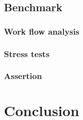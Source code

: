     \textcolor{gray}{\blindtext}

    \textcolor{gray}{\blindtext}

    \textcolor{gray}{\blindtext}
\section{Benchmark}
    \textcolor{gray}{\blindtext}

    \subsection{Work flow analysis}
    \textcolor{gray}{\blindtext}

    \textcolor{gray}{\blindtext}

    \subsection{Stress tests}
    \textcolor{gray}{\blindtext}

    \textcolor{gray}{\blindtext}

    \textcolor{gray}{\blindtext}

    \textcolor{gray}{\blindtext}

    \textcolor{gray}{\blindtext}

    \textcolor{gray}{\blindtext}

    \subsection{Assertion}
    \textcolor{gray}{\blindtext}

    \textcolor{gray}{\blindtext}

\chapter{Conclusion}
    \textcolor{gray}{\blindtext}
    \textcolor{gray}{\blindtext}
    \textcolor{gray}{\blindtext}
    \textcolor{gray}{\blindtext}
    \textcolor{gray}{\blindtext}

